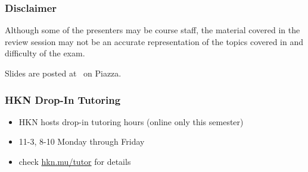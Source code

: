 \providecommand{\SlideAccessingLogistics}{}

\begin{frame}

\titlepage

\end{frame}

\begin{frame}[t]\vspace{20pt}
\frametitle{Disclaimer}
Although some of the presenters may be course staff, the material covered in the review session may not be an accurate representation of the topics covered in and difficulty of the exam.

\vspace{20pt}
Slides are posted at \SlideAccessingLogistics\ on Piazza.

\end{frame}


\begin{frame}[t]\vspace{20pt}
\frametitle{HKN Drop-In Tutoring}

\begin{itemize}
    \item HKN hosts drop-in tutoring hours (online only this semester)
    \item 11-3, 8-10 Monday through Friday
    \item check \url{hkn.mu/tutor} for details
\end{itemize}

\end{frame}
